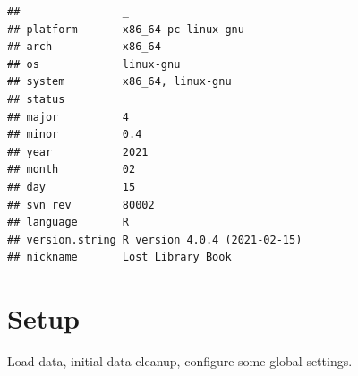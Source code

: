 \documentclass[]{book}
\begin{document}
\begin{verbatim}
##                _                           
## platform       x86_64-pc-linux-gnu         
## arch           x86_64                      
## os             linux-gnu                   
## system         x86_64, linux-gnu           
## status                                     
## major          4                           
## minor          0.4                         
## year           2021                        
## month          02                          
## day            15                          
## svn rev        80002                       
## language       R                           
## version.string R version 4.0.4 (2021-02-15)
## nickname       Lost Library Book
\end{verbatim}

\hypertarget{setup}{%
\section{Setup}\label{setup}}

Load data, initial data cleanup, configure some global settings.
\end{document}
